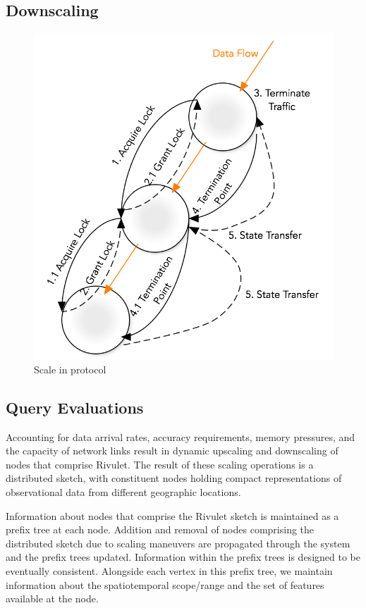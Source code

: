 \subsection{Downscaling}
\begin{figure}
    \centerline{\includegraphics[scale=0.55]{figures/scale-in-protocol.png}}
    \caption{Scale in protocol}
    \label{fig:scale-in-protocol}
\end{figure}

\subsection{Query Evaluations}
Accounting for data arrival rates, accuracy requirements, memory pressures, and the capacity of network links result in dynamic upscaling and downscaling of nodes that comprise Rivulet. The result of these scaling operations is a distributed sketch, with constituent nodes holding compact representations of observational data from different geographic locations. 

Information about nodes that comprise the Rivulet sketch is maintained as a prefix tree at each node. Addition and removal of nodes comprising the distributed sketch due to scaling maneuvers are propagated through the system and the prefix trees updated. Information within the prefix trees is designed to be eventually consistent.  Alongside each vertex in this prefix tree, we maintain information about the spatiotemporal scope/range and the set of features available at the node.  

